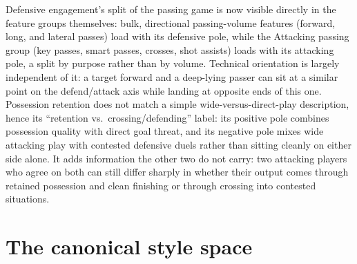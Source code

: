 Defensive engagement's split of the passing game is now visible directly in the feature groups themselves:
bulk, directional passing-volume features (forward, long, and lateral passes) load with its defensive pole,
while the Attacking passing group (key passes, smart passes, crosses, shot assists) loads with its attacking
pole, a split by purpose rather than by volume. Technical orientation is largely independent of it: a target
forward and a deep-lying passer can sit at a similar point on the defend/attack axis while landing at opposite
ends of this one. Possession retention does not match a simple wide-versus-direct-play description, hence its
``retention vs.\ crossing/defending'' label: its positive pole combines possession quality with direct goal
threat, and its negative pole mixes wide attacking play with contested defensive duels rather than sitting
cleanly on either side alone. It adds information the other two do not carry: two attacking players who agree
on both can still differ sharply in whether their output comes through retained possession and clean finishing
or through crossing into contested situations.

\section{The canonical style space}
\label{sec:results-stylespace}

